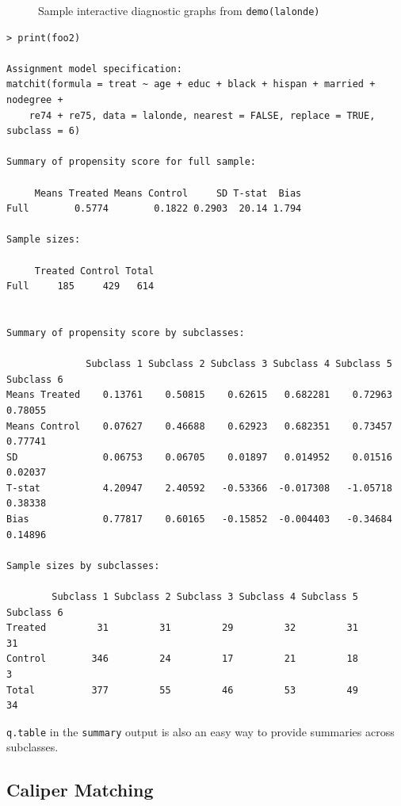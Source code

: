 \documentclass[oneside,letterpaper,titlepage]{article}
\begin{document}
\begin{figure}[tbp]
\begin{center}
    \hfill
    \caption{Sample interactive diagnostic graphs from \texttt{demo(lalonde)}}
\label{diags}
\end{center}
\end{figure}


\begin{verbatim}
> print(foo2)
 
Assignment model specification:
matchit(formula = treat ~ age + educ + black + hispan + married + nodegree + 
    re74 + re75, data = lalonde, nearest = FALSE, replace = TRUE, subclass = 6)
 
Summary of propensity score for full sample:
 
     Means Treated Means Control     SD T-stat  Bias
Full        0.5774        0.1822 0.2903  20.14 1.794
 
Sample sizes:
 
     Treated Control Total
Full     185     429   614
 
 
Summary of propensity score by subclasses:
 
              Subclass 1 Subclass 2 Subclass 3 Subclass 4 Subclass 5 Subclass 6
Means Treated    0.13761    0.50815    0.62615   0.682281    0.72963    0.78055
Means Control    0.07627    0.46688    0.62923   0.682351    0.73457    0.77741
SD               0.06753    0.06705    0.01897   0.014952    0.01516    0.02037
T-stat           4.20947    2.40592   -0.53366  -0.017308   -1.05718    0.38338
Bias             0.77817    0.60165   -0.15852  -0.004403   -0.34684    0.14896
 
Sample sizes by subclasses:
 
        Subclass 1 Subclass 2 Subclass 3 Subclass 4 Subclass 5 Subclass 6
Treated         31         31         29         32         31         31
Control        346         24         17         21         18          3
Total          377         55         46         53         49         34
\end{verbatim}

\noindent 
\texttt{q.table} in the {\tt summary} output is also an easy way to
provide summaries across subclasses.

\subsection{Caliper Matching}
\end{document}
